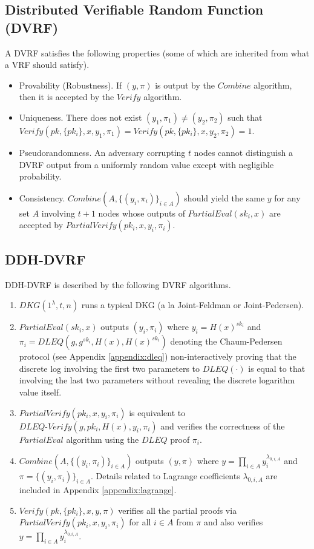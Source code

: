 \documentclass[letterpaper,twocolumn,10pt]{article}
\theoremstyle{definition}
\theoremstyle{remark}
\begin{document}
\subsection{Distributed Verifiable Random Function (DVRF)}
\label{appendix:dvrf}
A DVRF satisfies the following properties (some of which are inherited from what a VRF should satisfy).
\begin{itemize}
\item Provability (Robustness). If $(y, \pi)$ is output by the $Combine$ algorithm, then it is accepted by the $Verify$ algorithm.
\item Uniqueness. There does not exist $(y_1, \pi_1) \neq (y_2, \pi_2)$ such that $Verify(pk, \{pk_i\}, x, y_1, \pi_1) = Verify(pk, \{pk_i\}, x, y_2, \pi_2) = 1$.
\item Pseudorandomness. An adversary corrupting $t$ nodes cannot distinguish a DVRF output from a uniformly random value except with negligible probability.
\item Consistency. $Combine(A, \{(y_i, \pi_i)\}_{i \in A})$ should yield the same $y$ for any set $A$ involving $t + 1$ nodes whose outputs of $PartialEval(sk_i, x)$ are accepted by $PartialVerify(pk_i, x, y_i, \pi_i)$.
\end{itemize}

\subsection{DDH-DVRF}
\label{appendix:ddh-dvrf}
DDH-DVRF is described by the following DVRF algorithms.
\begin{enumerate}
\item $DKG(1^\lambda, t, n)$ runs a typical DKG (a la Joint-Feldman or Joint-Pedersen).
\item $PartialEval(sk_i, x)$ outputs $(y_i, \pi_i)$ where $y_i = H(x)^{sk_i}$ and $\pi_i = DLEQ(g, g^{sk_i}, H(x), H(x)^{sk_i})$ denoting the Chaum-Pedersen protocol (see Appendix \ref{appendix:dleq}) non-interactively proving that the discrete log involving the first two parameters to $DLEQ(\cdot)$ is equal to that involving the last two parameters without revealing the discrete logarithm value itself.
\item $PartialVerify(pk_i, x, y_i, \pi_i)$ is equivalent to $DLEQ\text{-}Verify(g, pk_i, H(x), y_i, \pi_i)$ and verifies the correctness of the $PartialEval$ algorithm using the $DLEQ$ proof $\pi_i$.
\item $Combine(A, \{(y_i, \pi_i)\}_{i \in A})$ outputs $(y, \pi)$ where $y = \prod_{i \in A} y_i^{\lambda_{0, i, A}}$ and $\pi = \{(y_i, \pi_i)\}_{i \in A}$. Details related to Lagrange coefficients $\lambda_{0, i, A}$ are included in Appendix \ref{appendix:lagrange}.
\item $Verify(pk, \{pk_i\}, x, y, \pi)$ verifies all the partial proofs via $PartialVerify(pk_i, x, y_i, \pi_i)$ for all $i \in A$ from $\pi$ and also verifies $y = \prod_{i \in A} y_i^{\lambda_{0, i, A}}$.
\end{enumerate}
\end{document}

